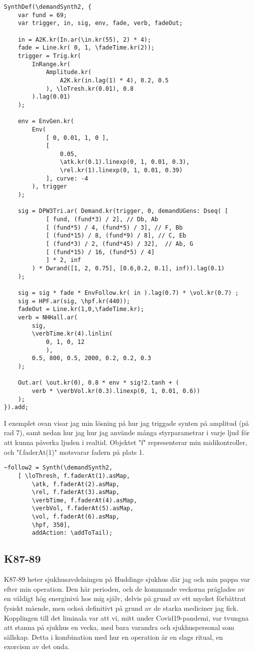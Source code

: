\documentclass{article}
\begin{document}
\begin{lstlisting}[style=SuperCollider-IDE, caption=Amplitudtriggad synt]
SynthDef(\demandSynth2, {
	var fund = 69;
	var trigger, in, sig, env, fade, verb, fadeOut;

	in = A2K.kr(In.ar(\in.kr(55), 2) * 4);
	fade = Line.kr( 0, 1, \fadeTime.kr(2));
	trigger = Trig.kr(
		InRange.kr( 
			Amplitude.kr(
				A2K.kr(in.lag(1) * 4), 0.2, 0.5
			), \loTresh.kr(0.01), 0.8 
		).lag(0.01)
	);

	env = EnvGen.kr(
		Env( 
			[ 0, 0.01, 1, 0 ],
			[
				0.05,
				\atk.kr(0.1).linexp(0, 1, 0.01, 0.3),
				\rel.kr(1).linexp(0, 1, 0.01, 0.39) 
			], curve: -4
		), trigger
	);

	sig = DPW3Tri.ar( Demand.kr(trigger, 0, demandUGens: Dseq( [ 
			[ fund, (fund*3) / 2], // Db, Ab
			[ (fund*5) / 4, (fund*5) / 3], // F, Bb
			[ (fund*15) / 8, (fund*9) / 8], // C, Eb
			[ (fund*3) / 2, (fund*45) / 32],  // Ab, G
			[ (fund*15) / 16, (fund*5) / 4]
			] * 2, inf
		) * Dwrand([1, 2, 0.75], [0.6,0.2, 0.1], inf)).lag(0.1)
	);

	sig = sig * fade * EnvFollow.kr( in ).lag(0.7) * \vol.kr(0.7) ;
	sig = HPF.ar(sig, \hpf.kr(440));
	fadeOut = Line.kr(1,0,\fadeTime.kr);
	verb = NHHall.ar(
		sig, 
		\verbTime.kr(4).linlin(
			0, 1, 0, 12
			), 
		0.5, 800, 0.5, 2000, 0.2, 0.2, 0.3
	);

	Out.ar( \out.kr(0), 0.8 * env * sig!2.tanh + ( 
		verb * \verbVol.kr(0.3).linexp(0, 1, 0.01, 0.6))
	);  
}).add;
\end{lstlisting}


  I exemplet ovan visar jag min lösning på hur jag triggade synten på amplitud (på rad 7), samt nedan hur jag
  hur jag använde många styrparametrar i varje ljud för att kunna påverka ljuden i realtid. Objektet "f"
  representerar min midikontroller, och "f.faderAt(1)" motsvarar fadern på plats 1.


\begin{lstlisting}[style=SuperCollider-IDE, caption=Syntens kontrollschema]
~follow2 = Synth(\demandSynth2, 
	[ \loThresh, f.faderAt(1).asMap,
		\atk, f.faderAt(2).asMap,
		\rel, f.faderAt(3).asMap,
		\verbTime, f.faderAt(4).asMap,
		\verbVol, f.faderAt(5).asMap,
		\vol, f.faderAt(6).asMap,
		\hpf, 350],
		addAction: \addToTail); 
\end{lstlisting}

  \subsection{K87-89}
  K87-89 heter sjukhusavdelningen på Huddinge sjukhus där jag och min pappa var efter min operation. Den här
  perioden, och de kommande veckorna präglades av en väldigt hög energinivå hos mig själv, delvis på grund av
  ett mycket förbättrat fysiskt mående, men också definitivt på grund av de starka mediciner jag fick.
  Kopplingen till det liminala var att vi, mitt under Covid19-pandemi, var tvungna att stanna på sjukhus en
  vecka, med bara varandra och sjukhuspersonal som sällskap. Detta i kombination med hur en operation är en
  slags ritual, en exorcism av det onda. 
\end{document}
